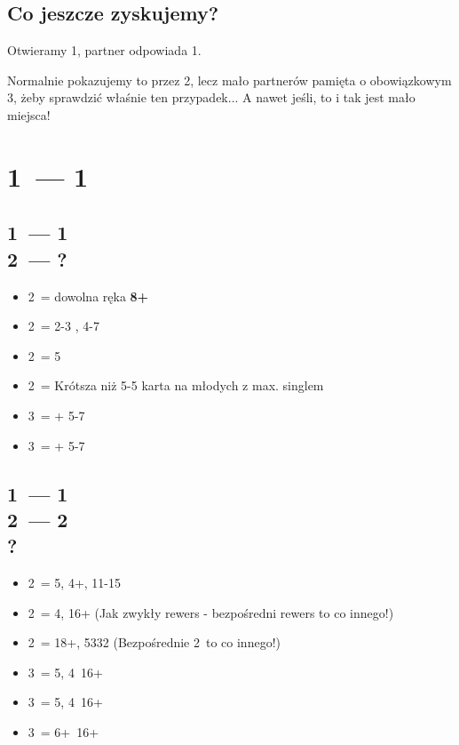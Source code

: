 \documentclass[12pt, a4paper]{article}
\begin{document}
\subsection*{Co jeszcze zyskujemy?}
Otwieramy 1\hearts, partner odpowiada 1\nt.
\begin{center}
\end{center}
Normalnie pokazujemy to przez 2\nt, lecz mało partnerów pamięta o obowiązkowym 3\clubs, żeby sprawdzić 
właśnie ten przypadek... A nawet jeśli, to i tak jest mało miejsca!


\pagebreak
\section*{1\hearts\ --- 1\ntx}

\subsection*{1\hearts\ --- 1\ntx \\ 2\clubs\ --- ?}
\begin{itemize}
    \item 2\diams\ = dowolna ręka \textbf{8+}
    \item 2\hearts\ = 2-3 \hearts, 4-7
    \item 2\spades\ = 5\diams \vimp
    \item 2\nt\ = Krótsza niż 5-5 karta na młodych z max. singlem \hearts \imp
    \item 3\clubs\ = + 5-7
    \item 3\diams\ = + 5-7
\end{itemize}

\subsection*{1\hearts\ --- 1\ntx \\ 2\clubs\ --- 2\diams \\ ?}
\begin{itemize}
    \item 2\hearts\ = 5\hearts, 4+\clubs, 11-15
    \item 2\spades\ = 4\spades, 16+ (Jak zwykły rewers - bezpośredni rewers to co innego!)
    \item 2\nt\ = 18+, 5332 (Bezpośrednie 2\nt\ to co innego!)
    \item 3\clubs\ = 5\hearts, 4\clubs\ 16+
    \item 3\diams\ = 5\hearts, 4\diams\ 16+
    \item 3\hearts\ = 6+\hearts\ 16+
\end{itemize}
\end{document}
